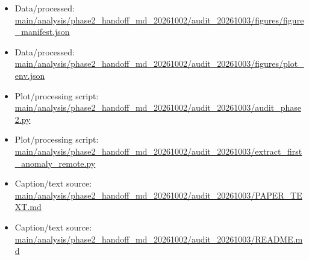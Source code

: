 \begin{itemize}[leftmargin=1.4em,noitemsep]
\item Data/processed: \begingroup\scriptsize\url{main/analysis/phase2_handoff_md_20261002/audit_20261003/figures/figure_manifest.json}\endgroup
\item Data/processed: \begingroup\scriptsize\url{main/analysis/phase2_handoff_md_20261002/audit_20261003/figures/plot_env.json}\endgroup
\item Plot/processing script: \begingroup\scriptsize\url{main/analysis/phase2_handoff_md_20261002/audit_20261003/audit_phase2.py}\endgroup
\item Plot/processing script: \begingroup\scriptsize\url{main/analysis/phase2_handoff_md_20261002/audit_20261003/extract_first_anomaly_remote.py}\endgroup
\item Caption/text source: \begingroup\scriptsize\url{main/analysis/phase2_handoff_md_20261002/audit_20261003/PAPER_TEXT.md}\endgroup
\item Caption/text source: \begingroup\scriptsize\url{main/analysis/phase2_handoff_md_20261002/audit_20261003/README.md}\endgroup
\end{itemize}
